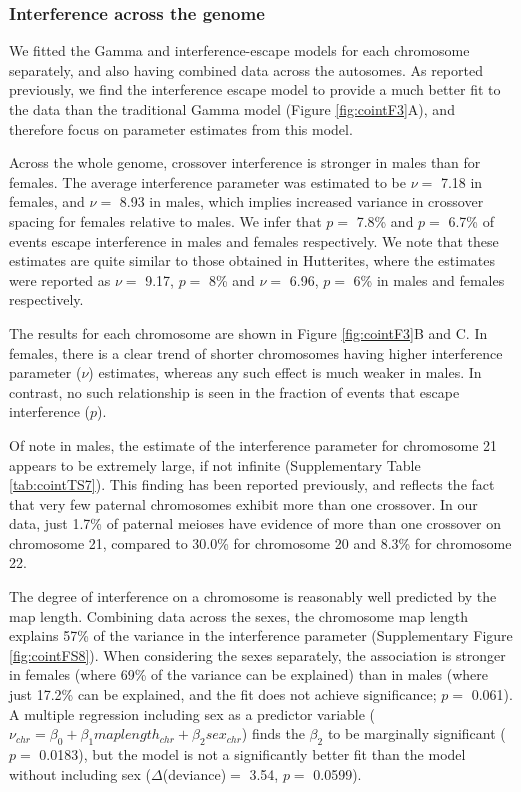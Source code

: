\subsubsection{Interference across the genome} %

We fitted the Gamma and interference-escape models for each chromosome  
separately, and also having combined data across the autosomes. As reported  
previously\cite{Fledel-Alon2009,Housworth2003}, we find the interference escape 
model to provide a much better fit to  the data than the traditional Gamma model (Figure \ref{fig:cointF3}A),
and therefore focus on parameter estimates from this model.  

Across the whole genome, crossover interference is stronger in males than  
for females. The average interference parameter was estimated to be $\nu=$ 7.18 in  
females, and $\nu=$ 8.93 in males, which implies increased variance in crossover  
spacing for females relative to males. We infer that $p=$ 7.8\% and $p=$ 6.7\% of  
events escape interference in males and females respectively. We note that these  
estimates are quite similar to those obtained in Hutterites\cite{Fledel-Alon2009},
where the estimates were reported as $\nu=$ 9.17, $p=$ 8\%  and $\nu=$ 6.96, $p=$ 6\%
in males and females respectively.  

The results for each chromosome are shown in Figure \ref{fig:cointF3}B and C. In females,  
there is a clear trend of shorter chromosomes having higher interference parameter  
($\nu$) estimates, whereas any such effect is much weaker in males. In contrast, no such  
relationship is seen in the fraction of events that escape interference ($p$).   

Of note in males, the estimate of the interference parameter for chromosome  
21 appears to be extremely large, if not infinite (Supplementary Table \ref{tab:cointTS7}). This  
finding has been reported previously\cite{Broman2000,Fledel-Alon2009}, and reflects the fact 
that very few paternal chromosomes exhibit more than one crossover. In our data, just 1.7\% of paternal  
meioses have evidence of more than one crossover on chromosome 21, compared to  
30.0\% for chromosome 20 and 8.3\% for chromosome 22.  

The degree of interference on a chromosome is reasonably well predicted by  
the map length. Combining data across the sexes, the chromosome map length  
explains 57\% of the variance in the interference parameter (Supplementary Figure  
\ref{fig:cointFS8}). When considering the sexes separately, the association is stronger in females  
(where 69\% of the variance can be explained) than in males (where just 17.2\% can  
be explained, and the fit does not achieve significance; $p=$ 0.061). A multiple
regression including sex as a predictor variable 
($\nu_{chr} = \beta_0 + \beta_1 maplength_{chr} + \beta_2 sex_{chr}$)
finds the $\beta_2$ to be marginally significant ($p=$ 0.0183), but the model is not 
a significantly better fit than the model without including sex ($\Delta$(deviance)$=$ 3.54, $p=$ 0.0599).  

